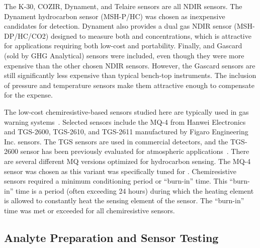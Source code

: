 \documentclass[sensors,article,submit,moreauthors,pdftex]{Definitions/mdpi}
\begin{document}
			
			The K-30, COZIR, Dynament, and Telaire sensors are all NDIR  sensors.
			The Dynament hydrocarbon sensor (MSH-P/HC) was chosen as inexpensive candidates for  detection.
			Dynament also provides a dual gas NDIR sensor (MSH-DP/HC/CO2) designed to measure both  and  concentrations, which is attractive for applications requiring both low-cost and portability.
			Finally,  and  Gascard (sold by GHG Analytical) sensors were included, even though they were more expensive than the other chosen NDIR sensors.
			However, the Gascard sensors are still significantly less expensive than typical bench-top instruments.
			The inclusion of pressure and temperature sensors make them attractive enough to compensate for the expense.
			

			The low-cost chemiresistive-based  sensors studied here are typically used in gas warning systems~\cite{chiu_towards_2013}.
			Selected sensors include the MQ-4 from Hanwei Electronics and TGS-2600, TGS-2610, and TGS-2611 manufactured by Figaro Engineering Inc. sensors.
			The TGS sensors are used in commercial  detectors, and the TGS-2600 sensor has been previously evaluated for atmospheric applications~\cite{eugster_performance_2012,bossche_potential_2017}.
			There are several different MQ versions optimized for hydrocarbon sensing.
			The MQ-4 sensor was chosen as this variant was specifically tuned for .
			Chemiresistive sensors required a minimum conditioning period or ``burn-in'' time.
			This ``burn-in'' time is a period (often exceeding 24 hours) during which the heating element is allowed to constantly heat the sensing element of the sensor.
			The ``burn-in'' time was met or exceeded for all chemiresistive sensors.
			
			
		\subsection{Analyte Preparation and Sensor Testing}
			
\end{document}

